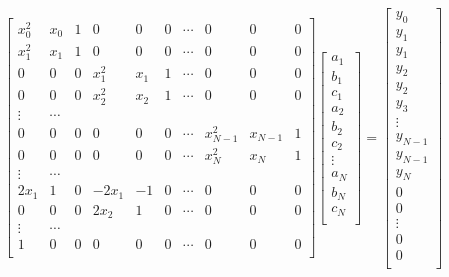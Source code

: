 \documentclass[11pt,titlepage,fleqn]{article}
\begin{document}
\begin{equation}
\begin{bmatrix}
x_0^2 & x_0 & 1 & 0 & 0 & 0 & \cdots & 0 & 0 & 0 \\
x_1^2 & x_1 & 1 & 0 & 0 & 0 & \cdots & 0 & 0 & 0 \\
0 & 0 & 0 & x_1^2 & x_1 & 1 & \cdots & 0 & 0 & 0 \\
0 & 0 & 0 & x_2^2 & x_2 & 1 & \cdots & 0 & 0 & 0 \\
\vdots  & \cdots \\
0 & 0 & 0 & 0 & 0  & 0 & \cdots & x_{N-1}^2 & x_{N-1} & 1 \\
0 & 0 & 0 & 0 & 0  & 0 & 
\cdots & x_N^2 & x_N & 1 \\
\vdots  & \cdots\\
2x_1 & 1 & 0 & -2x_1 & -1 & 0 & \cdots & 0 & 0 & 0 \\
0 & 0 & 0 & 2x_2 & 1 & 0 & \cdots & 0 & 0 & 0 \\
\vdots  & \cdots\\
1 & 0 & 0 & 0 & 0 & 0 & \cdots & 0 & 0 & 0 \\
\end{bmatrix}
\begin{bmatrix}
a_1 \\
b_1\\
c_1\\
a_2\\
b_2\\
c_2\\
\vdots\\
a_N\\
b_N\\
c_N\\
\end{bmatrix} = 
\begin{bmatrix}
y_0 \\
y_1\\
y_1\\
y_2\\
y_2\\
y_3\\
\vdots\\
y_{N-1}\\
y_{N-1}\\
y_N\\
0\\
0\\
\vdots\\
0\\
0\\
\end{bmatrix}
\end{equation}
\end{document}
